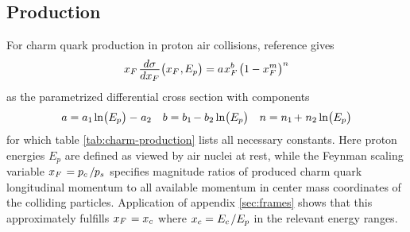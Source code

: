 \subsection*{Production}

For charm quark production in proton air collisions, reference \cite{Goncalves_2007} gives
\begin{equation*}
	x_F \kern+1.0pt \frac{\raisebox{-0.5ex}{$d\sigma$}}{\raisebox{0.5ex}{$dx_F$}} \bigl( x_F \kern+0.5pt, \kern-0.5pt E_p \bigr)
	= a \kern+0.5pt x_F^b \kern+1.0pt \bigl( 1 \kern-0.3pt - x_F^m \kern+0.3pt \bigr)^n
\end{equation*}
as the parametrized differential cross section with components
\begin{align*}
	a = a_1 \kern-0.5pt \ln\bigl(E_p\bigr) - \kern+0.5pt a_2 && b = b_1 \kern-1.0pt - b_2 \ln\bigl(E_p\bigr) &&
	n = n_1 \kern-1.0pt + \kern+0.5pt n_2 \ln\bigl(E_p\bigr)
\end{align*}
for which table \ref{tab:charm-production} lists all necessary constants. Here proton energies $E_p$ are defined as viewed
by air nuclei at rest, while the Feynman scaling variable $x_F \kern+1.0pt = p_c \kern+1.5pt / \kern-0.5pt p_s$ specifies
magnitude ratios of produced charm quark longitudinal momentum to all available momentum in center mass coordinates of the
colliding particles. Application of appendix \ref{sec:frames} shows that this approximately fulfills $x_F \kern+1.0pt = x_c$
where $x_c = \kern+0.2pt E_c \kern+1.0pt / E_p$ in the relevant energy ranges.



